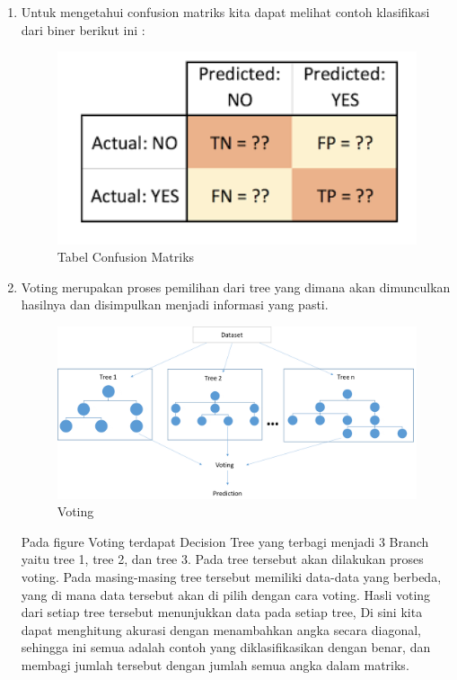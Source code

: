 \begin{enumerate}
\item Untuk mengetahui confusion matriks kita dapat melihat contoh klasifikasi dari biner berikut ini :
	\begin{figure}[ht]
	\centerline{\includegraphics[width=1\textwidth]{figures/andi/CM.PNG}}
	\caption{Tabel Confusion Matriks}
	\label{contoh}
	\end{figure}
\item Voting merupakan proses pemilihan dari tree yang dimana akan dimunculkan hasilnya dan disimpulkan menjadi informasi yang pasti.
	\begin{figure}[ht]
	\centerline{\includegraphics[width=1\textwidth]{figures/andi/Voting.PNG}}
	\caption{Voting}
	\label{Contoh Voting}
	\end{figure}

Pada figure Voting terdapat Decision Tree yang terbagi menjadi 3 Branch yaitu tree 1, tree 2, dan tree 3. Pada tree tersebut akan dilakukan proses voting. Pada  masing-masing tree tersebut memiliki data-data yang berbeda, yang di mana data tersebut akan di pilih dengan cara voting. Hasli voting dari setiap tree tersebut menunjukkan data pada setiap tree, Di sini kita dapat menghitung akurasi dengan menambahkan angka secara diagonal, sehingga ini semua adalah contoh yang diklasifikasikan dengan benar, dan membagi jumlah tersebut dengan jumlah semua angka dalam matriks.

\end{enumerate}


